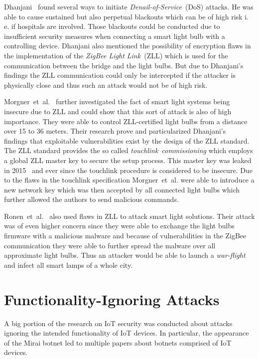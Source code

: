 \documentclass[11pt,a4paper]{article}
\begin{document}
	Dhanjani~\cite{Dhanjani:2013:HLSEPHPWLS} found several ways to initiate \textit{Denail-of-Service}~(DoS) attacks. He was able to cause sustained but also perpetual blackouts which can be of high risk i. e. if hospitals are involved. Those blackouts could be conducted due to insufficient security measures when connecting a smart light bulb with a controlling device. Dhanjani also mentioned the possibility of encryption flaws in the implementation of the \textit{ZigBee Light Link}~(ZLL) which is used for the communication between the bridge and the light bulbs. But due to Dhanjani's findings the ZLL communication could only be intercepted if the attacker is physically close and thus such an attack would not be of high risk.

	Morgner~et~al.~\cite{Morgner:2016:AYBBUICSSCLS} further investigated the fact of smart light systems being insecure due to ZLL and could show that this sort of attack is also of high importance. They were able to control ZLL-certified light bulbs from a distance over 15 to 36 meters. Their research prove and particularized Dhanjani's~\cite{Dhanjani:2013:HLSEPHPWLS} findings that exploitable vulnerabilities exist by the design of the ZLL standard. The ZLL standard provides the so called \textit{touchlink~commissioning} which employs a global ZLL master key to secure the setup process. This master key was leaked in 2015~\cite{Morgner:2016:AYBBUICSSCLS} and ever since the touchlink procedure is considered to be insecure. Due to the flaws in the touchlink specification Morgner~et~al. were able to introduce a new network key which was then accepted by all connected light bulbs which further allowed the authors to send malicious commands.

	Ronen~et~al.~\cite{Ronen:2018:IGNCZCR} also used flaws in ZLL to attack smart light solutions. Their attack was of even higher concern since they were able to exchange the light bulbs firmware with a malicious malware and because of vulnerabilities in the ZigBee communication they were able to further spread the malware over all approximate light bulbs. Thus an attacker would be able to launch a \textit{war-flight} and infect all smart lamps of a whole city.

	\section{Functionality-Ignoring Attacks}%
	\label{sec:functionality_ignoring_attacks}
	A big portion of the research on IoT security was conducted about attacks ignoring the intended functionality of IoT devices. In particular, the appearance of the Mirai botnet led to multiple papers about botnets comprised of IoT devices.
\end{document}
